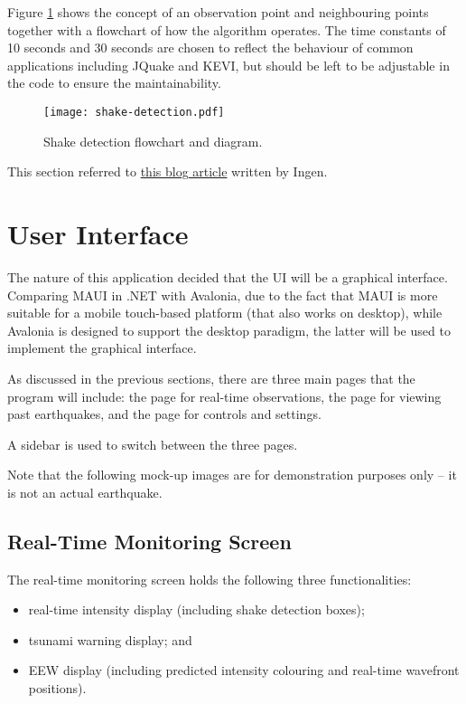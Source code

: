 Figure \ref{fig:shake-detection-diag} shows the concept of an observation point and neighbouring points together with a flowchart of how the algorithm operates. The time constants of 10 seconds and 30 seconds are chosen to reflect the behaviour of common applications including JQuake and KEVI, but should be left to be adjustable in the code to ensure the maintainability.

\begin{figure}[!ht]
    \centering
    \texttt{[image: shake-detection.pdf]}
    \caption{Shake detection flowchart and diagram.}
    \label{fig:shake-detection-diag}
\end{figure}

This section referred to \href{https://qiita.com/ingen084/items/82985e8d3227c97c608d}{this blog article} written by Ingen.

\section{User Interface}

The nature of this application decided that the UI will be a graphical interface. Comparing MAUI in .NET with Avalonia, due to the fact that MAUI is more suitable for a mobile touch-based platform (that also works on desktop), while Avalonia is designed to support the desktop paradigm, the latter will be used to implement the graphical interface.

As discussed in the previous sections, there are three main pages that the program will include: the page for real-time observations, the page for viewing past earthquakes, and the page for controls and settings.

A sidebar is used to switch between the three pages.

Note that the following mock-up images are for demonstration purposes only -- it is not an actual earthquake.

\subsection{Real-Time Monitoring Screen}

The real-time monitoring screen holds the following three functionalities:
\begin{itemize}
    \item real-time intensity display (including shake detection boxes);
    \item tsunami warning display; and
    \item EEW display (including predicted intensity colouring and real-time wavefront positions).
\end{itemize}

